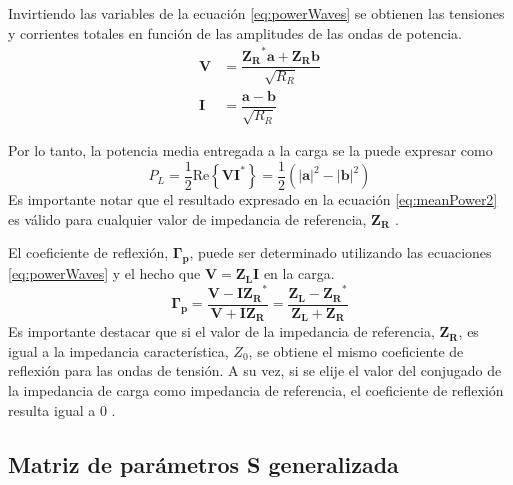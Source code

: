 Invirtiendo las variables de la ecuación \ref{eq:powerWaves} se obtienen las tensiones y corrientes totales en función de las amplitudes de las ondas de potencia.
\begin{equation}\label{eq:powerWaves1}
\begin{aligned}
  \bm{V} &= \dfrac{\bm{Z_R}^*\bm{a} + \bm{Z_R}\bm{b}}{\sqrt{R_R}} \\
  \bm{I} &= \dfrac{\bm{a} - \bm{b}}{\sqrt{R_R}}
\end{aligned}
\end{equation}

Por lo tanto, la potencia media entregada a la carga se la puede expresar como
\begin{equation}\label{eq:meanPower2}
  P_L = \dfrac{1}{2}\text{Re}\left\lbrace \bm{V}\bm{I}^*\right\rbrace = \dfrac{1}{2}(|\bm{a}|^2 - |\bm{b}|^2)
\end{equation}
Es importante notar que el resultado expresado en la ecuación \ref{eq:meanPower2} es válido para cualquier valor de impedancia de referencia, $\bm{Z_R}$ \cite{Pozar2012}.

El coeficiente de reflexión, $\bm{\Gamma_p}$, puede ser determinado utilizando las ecuaciones \ref{eq:powerWaves} y el hecho que $\bm{V} = \bm{Z_LI}$ en la carga.
\begin{equation}
  \bm{\Gamma_p} = \dfrac{\bm{V} - \bm{I}\bm{Z_R}^*}{\bm{V} + \bm{I}\bm{Z_R}} = \dfrac{\bm{Z_L} - \bm{Z_R}^*}{\bm{Z_L} + \bm{Z_R}}
\end{equation}
Es importante destacar que si el valor de la impedancia de referencia, $\bm{Z_R}$, es igual a la impedancia característica, $Z_0$, se obtiene el mismo coeficiente de reflexión para las ondas de tensión. A su vez, si se elije el valor del conjugado de la impedancia de carga como impedancia de referencia, el coeficiente de reflexión resulta igual a 0 \cite{Pozar2012}.


\subsection{Matriz de parámetros S generalizada}


